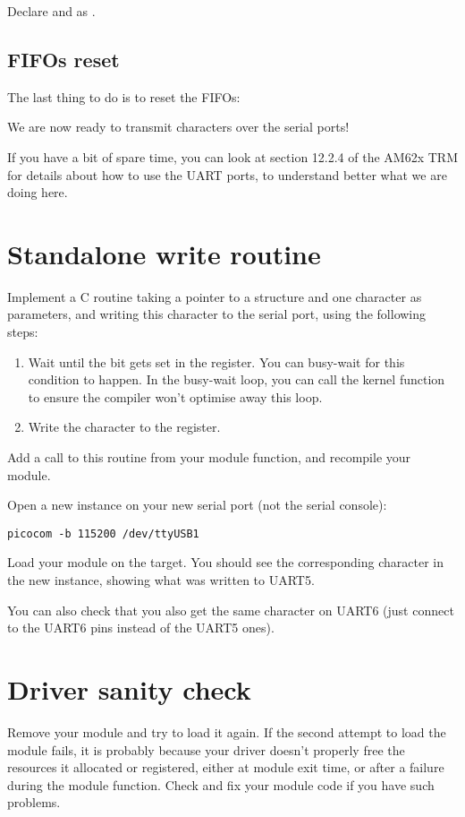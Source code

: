 
Declare  and  as .

\subsection{FIFOs reset}

The last thing to do is to reset the FIFOs:


We are now ready to transmit characters over the serial ports!

If you have a bit of spare time, you can look at section 12.2.4 of the
AM62x TRM for details about how to use the UART ports, to understand
better what we are doing here.

\section{Standalone write routine}

Implement a C routine taking a pointer to a 
structure and one character as parameters, and writing
this character to the serial port, using the following steps:

\begin{enumerate}
\item Wait until the  bit gets set in the
   register.  You can busy-wait for this condition to happen.
  In the busy-wait loop, you can call the  kernel function
  to ensure the compiler won't optimise away this loop.
\item Write the character to the  register.
\end{enumerate}

Add a call to this routine from your module  function,
and recompile your module.

Open a new  instance on your new serial port (not the
serial console):

\begin{verbatim}
picocom -b 115200 /dev/ttyUSB1
\end{verbatim}

Load your module on the target. You should see the
corresponding character in the new  instance,
showing what was written to UART5.

You can also check that you also get the same character on UART6
(just connect to the UART6 pins instead of the UART5 ones).

\section{Driver sanity check}

Remove your module and try to load it again. If the second attempt to
load the module fails, it is probably because your driver doesn't
properly free the resources it allocated or registered, either at module
exit time, or after a failure during the module  function. Check
and fix your module code if you have such problems.
